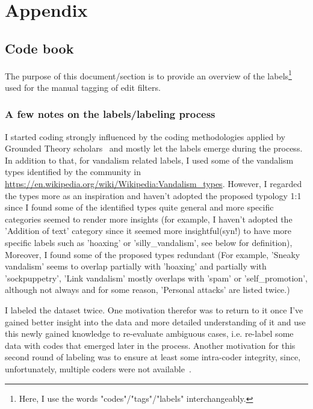 %

\chapter{Appendix}
\label{ch:Appendix}

\section{Code book}
\label{app:code_book}

The purpose of this document/section is to provide an overview of the labels\footnote{Here, I use the words "codes"/"tags"/"labels" interchangeably.} used for the manual tagging of edit filters.

\subsection{A few notes on the labels/labeling process}

I started coding strongly influenced by the coding methodologies applied by Grounded Theory scholars~\cite[42-71]{Charmaz2006} and mostly let the labels emerge during the process. %
In addition to that, for vandalism related labels, I used some of the vandalism types identified by the community in \url{https://en.wikipedia.org/wiki/Wikipedia:Vandalism_types}\cite{Wikipedia:VandalismTypes}.
However, I regarded the types more as an inspiration and haven't adopted the proposed typology 1:1 since I found some of the identified types quite general and more specific categories seemed to render more insights
(for example, I haven't adopted the 'Addition of text' category since it seemed more insightful(syn!) to have more specific labels such as 'hoaxing' or 'silly\_vandalism', see below for definition),
Moreover, I found some of the proposed types redundant
(For example, 'Sneaky vandalism' seems to overlap partially with 'hoaxing' and partially with 'sockpuppetry', 'Link vandalism' mostly overlaps with 'spam' or 'self\_promotion', although not always and for some reason, 'Personal attacks' are listed twice.)

I labeled the dataset twice.
One motivation therefor was to return to it once I've gained better insight into the data and more detailed understanding of it and use this newly gained knowledge to re-evaluate ambiguous cases, i.e. re-label some data with codes that emerged later in the process.
Another motivation for this second round of labeling was to ensure at least some intra-coder integrity, since, unfortunately, multiple coders were not available~\cite{LazFenHo2017}. %


